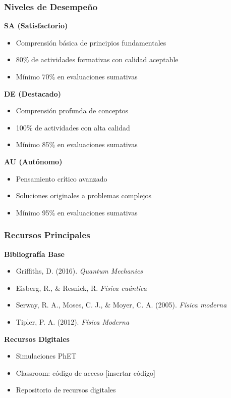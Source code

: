 \documentclass{beamer}
\begin{document}
\begin{frame}
    \frametitle{Niveles de Desempeño}
    
    \textbf{SA (Satisfactorio)}
    \begin{itemize}
        \item Comprensión básica de principios fundamentales
        \item 80\% de actividades formativas con calidad aceptable
        \item Mínimo 70\% en evaluaciones sumativas
    \end{itemize}
    \vspace{0.2cm}
    
    \textbf{DE (Destacado)}
    \begin{itemize}
        \item Comprensión profunda de conceptos
        \item 100\% de actividades con alta calidad
        \item Mínimo 85\% en evaluaciones sumativas
    \end{itemize}
    \vspace{0.2cm}
    
    \textbf{AU (Autónomo)}
    \begin{itemize}
        \item Pensamiento crítico avanzado
        \item Soluciones originales a problemas complejos
        \item Mínimo 95\% en evaluaciones sumativas
    \end{itemize}
\end{frame}

\begin{frame}
    \frametitle{Recursos Principales}
    
    \textbf{Bibliografía Base}
    \begin{itemize}
        \item Griffiths, D. (2016). \textit{Quantum Mechanics}
        \item Eisberg, R., \& Resnick, R. \textit{Física cuántica}
        \item Serway, R. A., Moses, C. J., \& Moyer, C. A. (2005). \textit{Física moderna}
        \item Tipler, P. A. (2012). \textit{Física Moderna}
    \end{itemize}
    \vspace{0.3cm}
    
    \textbf{Recursos Digitales}
    \begin{itemize}
        \item Simulaciones PhET
        \item Classroom: código de acceso [insertar código]
        \item Repositorio de recursos digitales
    \end{itemize}
\end{frame}
\end{document}
